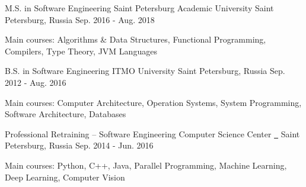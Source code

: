 

\begin{cventries}

  \cventry
    {M.S. in Software Engineering} %
    {Saint Petersburg Academic University} %
    {Saint Petersburg, Russia} %
    {Sep. 2016 - Aug. 2018} %
    {
      \begin{cvitems} %
        \item {Main courses: Algorithms \& Data Structures, Functional Programming, Compilers, Type Theory, JVM Languages}
      \end{cvitems}
    }

  \cventry
    {B.S. in Software Engineering} %
    {ITMO University} %
    {Saint Petersburg, Russia} %
    {Sep. 2012 - Aug. 2016} %
    {
      \begin{cvitems} %
        \item {Main courses: Computer Architecture, Operation Systems, System Programming, Software Architecture, Databases}
      \end{cvitems}
    }

  \cventry
    {Professional Retraining -- Software Engineering} %
    {Computer Science Center \href{https://compscicenter.ru/students/752/}{\ \faLink}} %
    {Saint Petersburg, Russia} %
    {Sep. 2014 - Jun. 2016} %
    {
      \begin{cvitems} %
        \item {Main courses: Python, C++, Java, Parallel Programming, Machine Learning, Deep Learning, Computer Vision}
      \end{cvitems}
    }

\end{cventries}
